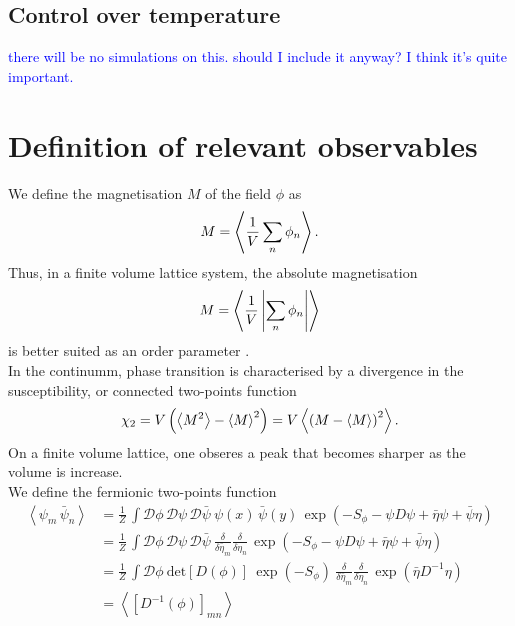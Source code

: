 \subsection{Control over temperature}
\textcolor{blue}{there will be no simulations on this. should I include it anyway? I think it's quite important.}

\section{Definition of relevant observables}
\label{sec:observables}
We define the magnetisation $M$ of the field $\phi$ as
\begin{equation*}
    M = \left\langle \frac{1}{V}\sum_n \phi_n \right\rangle.
\end{equation*}
Thus, in a finite volume lattice system, the absolute magnetisation
\begin{equation*}
    M = \left\langle \frac{1}{V}\left|\sum_n \phi_n\right| \right\rangle
\end{equation*}
is better suited as an order parameter \cite{friedli_velenik_2017,gattringer_LQCD}. \\
In the continumm, phase transition is characterised by a divergence in the susceptibility, or connected two-points function
\begin{equation*}
    \chi_2 = V \left(\left\langle M^2 \right\rangle - \left\langle M \right\rangle^2\right) = V \left\langle \left(M-\left\langle M \right\rangle\right)^2 \right\rangle.
\end{equation*}
On a finite volume lattice, one obseres a peak that becomes sharper as the volume is increase. \\
We define the fermionic two-points function
\begin{equation} 
\begin{aligned}
    \left\langle \psi_m \, \bar\psi_n \right\rangle 
    &= \frac{1}{Z} \, \int \mathcal{D}\phi \, \mathcal{D}\psi \, \mathcal{D}\bar\psi \ \psi(x) \, \bar\psi(y) \, \exp \left( - S_\phi - \psi D \psi + \bar\eta \psi + \bar \psi \eta \right) \\
    &= \frac{1}{Z} \, \int \mathcal{D}\phi \, \mathcal{D}\psi \, \mathcal{D}\bar\psi \ \frac{\delta}{\delta \bar \eta_m} \frac{\delta}{\delta \eta_n} \, \exp \left( - S_\phi - \psi D \psi + \bar\eta \psi + \bar \psi \eta \right) \\
    &= \frac{1}{Z} \, \int \mathcal{D}\phi \ \text{det}\left[D(\phi)\right] \ \exp \left( - S_\phi \right) \ \frac{\delta}{\delta \bar \eta_m} \frac{\delta}{\delta \eta_n} \, \exp\left( \bar\eta D^{-1} \eta \right) \\
    &= \left\langle \left[D^{-1}(\phi)\right]_{mn}\right\rangle
\end{aligned}
\label{eq:D_inv_condensate}
\end{equation}
